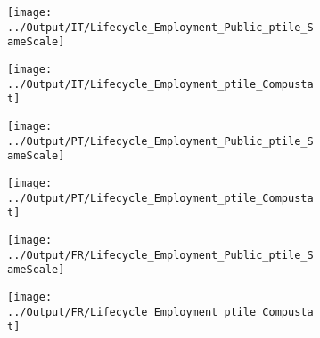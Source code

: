 \documentclass[12pt,notitlepage]{article}
\begin{document}
\begin{figure}[!htpb]
\centering
\begin{subfigure}{.49\textwidth}
    \centering
 \texttt{[image: ../Output/IT/Lifecycle\_Employment\_Public\_ptile\_SameScale]}
\end{subfigure}%
\begin{subfigure}{.49\textwidth}
    \centering
 \texttt{[image: ../Output/IT/Lifecycle\_Employment\_ptile\_Compustat]}
\end{subfigure}
\begin{subfigure}{.49\textwidth}
    \centering
 \texttt{[image: ../Output/PT/Lifecycle\_Employment\_Public\_ptile\_SameScale]}
\end{subfigure}%
\begin{subfigure}{.49\textwidth}
    \centering
 \texttt{[image: ../Output/PT/Lifecycle\_Employment\_ptile\_Compustat]}
\end{subfigure}
\begin{subfigure}{.49\textwidth}
    \centering
 \texttt{[image: ../Output/FR/Lifecycle\_Employment\_Public\_ptile\_SameScale]}
\end{subfigure}%
\begin{subfigure}{.49\textwidth}
    \centering
 \texttt{[image: ../Output/FR/Lifecycle\_Employment\_ptile\_Compustat]}
\end{subfigure}
\end{figure}
\pagebreak
\end{document}
